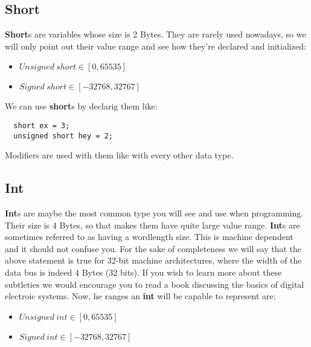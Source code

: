 \documentclass[12pt]{book}
\begin{document}
\subsection{Short}

\textbf{Short}s are variables whose size is 2 Bytes. They are rarely used nowadays, so we will only point out their value range and see how they're declared and initialized:

\begin{itemize}
  \item $Unsigned\ short \in [0, 65535]$
  \item $Signed\ short \in [-32768, 32767]$
\end{itemize}

We can use \textbf{short}s by declarig them like:

\begin{verbatim}
  short ex = 3;
  unsigned short hey = 2;
\end{verbatim}

Modifiers are used with them like with every other data type.



\subsection{Int}

\textbf{Int}s are maybe the most common type you will see and use when programming. Their size is 4 Bytes, so that makes them have quite large value range. \textbf{Int}s are sometimes referred to as having a wordlength size. This is machine dependent and it should not confuse you. For the sake of completeness we will say that the above statement is true for 32-bit machine architectures, where the width of the data bus is indeed 4 Bytes (32 bits). If you wish to learn more about these subtleties we would encourage you to read a book discussing the basics of digital electroic systems. Now, he ranges an \textbf{int} will be capable to represent are:

\begin{itemize}
  \item $Unsigned\ int \in [0, 65535]$
  \item $Signed\ int \in [-32768, 32767]$
\end{itemize}
\end{document}
